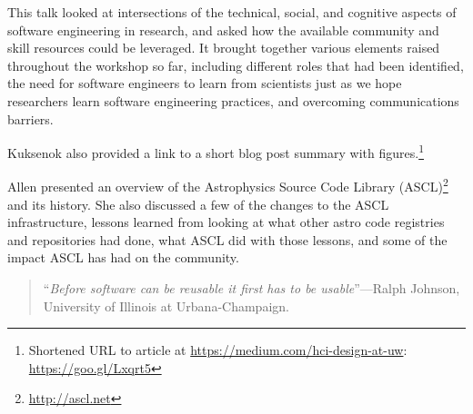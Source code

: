 \documentclass[a4paper,UKenglish]{dagrep}
\begin{document}

This talk looked at intersections of the technical, social, and cognitive aspects of software engineering in research, and asked how the available community and skill resources could be leveraged. It brought together various elements raised throughout the workshop so far, including different roles that had been identified, the need for software engineers to learn from scientists just as we hope researchers learn software engineering practices, and overcoming communications barriers.

Kuksenok also provided a link to a short blog post summary with figures.\footnote{Shortened URL to article at \url{https://medium.com/hci-design-at-uw}: \url{https://goo.gl/Lxqrt5}}



Allen presented an overview of the Astrophysics Source Code Library (ASCL)\footnote{\url{http://ascl.net}} and its history.
She also discussed a few of the changes to the ASCL infrastructure, lessons learned from looking at what other astro code registries and repositories had done, what ASCL did with those lessons, and some of the impact ASCL has had on the community.


\begin{quote}
``\textit{Before software can be reusable it first has to be usable}''---Ralph Johnson, University of Illinois at Urbana-Champaign.
\end{quote}
\end{document}
